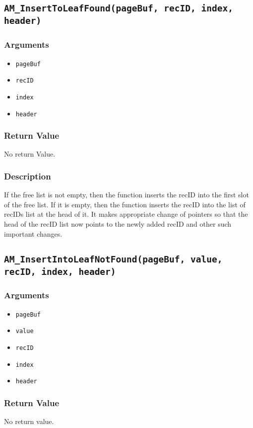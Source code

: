 \documentclass[a4paper, 12pt]{article}
\begin{document}
\subsection{\texttt{AM\_InsertToLeafFound(pageBuf, recID, index, header)}}
\subsubsection{Arguments}
\begin{itemize}
	\item{\texttt{pageBuf}}
	\item{\texttt{recID}}
	\item{\texttt{index}}
	\item{\texttt{header}}
\end{itemize}
\subsubsection{Return Value}
No return Value.
\subsubsection{Description}
If the free list is not empty, then the function inserts the recID into the first slot of the free list. If it is empty, then the function inserts the recID into the list of recIDs list at the head of it. It makes appropriate change of pointers so that the head of the recID list now points to the newly added recID and other such important changes.

\subsection{\texttt{AM\_InsertIntoLeafNotFound(pageBuf, value, recID, index, header)}}
\subsubsection{Arguments}
\begin{itemize}
	\item{\texttt{pageBuf}}
	\item{\texttt{value}}
	\item{\texttt{recID}}
	\item{\texttt{index}}
	\item{\texttt{header}}
\end{itemize}
\subsubsection{Return Value}
No return value.
\end{document}
